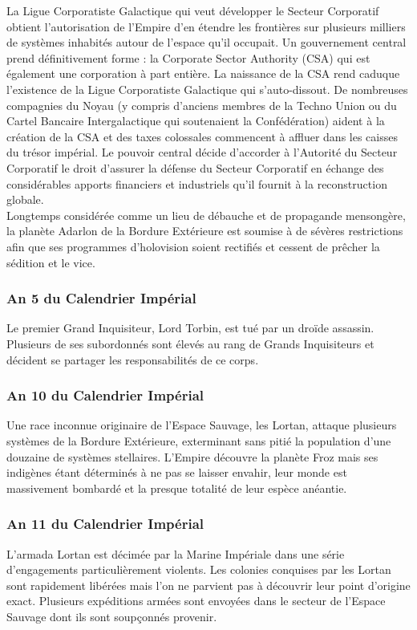 \documentclass[twoside]{article}
\begin{document}
La Ligue Corporatiste Galactique qui veut développer le Secteur Corporatif obtient l'autorisation de l'Empire d'en étendre les frontières sur plusieurs milliers de systèmes inhabités autour de l'espace qu'il occupait. Un gouvernement central prend définitivement forme : la Corporate Sector Authority (CSA) qui est également une corporation à part entière. La naissance de la CSA rend caduque l'existence de la Ligue Corporatiste Galactique qui s'auto-dissout. De nombreuses compagnies du Noyau (y compris d'anciens membres de la Techno Union ou du Cartel Bancaire Intergalactique qui soutenaient la Confédération)  aident à la création de la CSA et des taxes colossales commencent à affluer dans les caisses du trésor impérial. Le pouvoir central décide d'accorder à l'Autorité du Secteur Corporatif le droit d'assurer la défense du Secteur Corporatif en échange des considérables apports financiers et industriels qu'il fournit à la reconstruction globale.\\

Longtemps considérée comme un lieu de débauche et de propagande mensongère, la planète Adarlon de la Bordure Extérieure est soumise à de sévères restrictions afin que ses programmes d'holovision soient rectifiés et cessent de prêcher la sédition et le vice.

\subsubsection*{An 5 du Calendrier Impérial}
Le premier Grand Inquisiteur, Lord Torbin, est tué par un droïde assassin. Plusieurs de ses subordonnés sont élevés au rang de Grands Inquisiteurs et décident se partager les responsabilités de ce corps.

\subsubsection*{An 10 du Calendrier Impérial}
Une race inconnue originaire de l'Espace Sauvage, les Lortan, attaque plusieurs systèmes de la Bordure Extérieure, exterminant sans pitié la population d'une douzaine de systèmes stellaires.
L'Empire découvre la planète Froz mais ses indigènes étant déterminés à ne pas se laisser envahir, leur monde est massivement bombardé et la presque totalité de leur espèce anéantie. 

\subsubsection*{An 11 du Calendrier Impérial}
L'armada Lortan est décimée par la Marine Impériale dans une série d'engagements particulièrement violents. Les colonies conquises par les Lortan sont rapidement libérées mais l'on ne parvient pas à découvrir leur point d'origine exact. Plusieurs expéditions armées sont envoyées dans le secteur de l'Espace Sauvage dont ils sont soupçonnés provenir.
\end{document}
